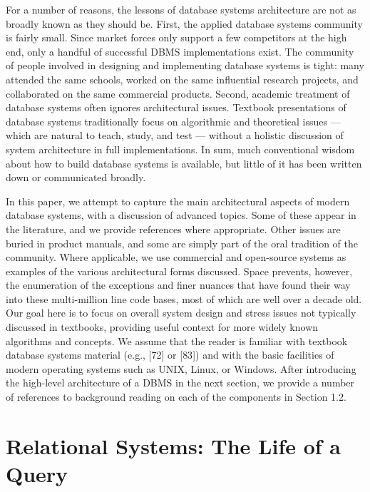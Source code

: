 \documentclass[a4paper,11pt,twoside,openright]{book}
\begin{document}
For a number of reasons, the lessons of database systems architecture
are not as broadly known as they should be. First, the applied database
systems community is fairly small. Since market forces only support a
few competitors at the high end, only a handful of successful DBMS
implementations exist. The community of people involved in designing and
implementing database systems is tight: many attended the same schools,
worked on the same influential research projects, and collaborated on
the same commercial products. Second, academic treatment of database
systems often ignores architectural issues. Textbook presentations of
database systems traditionally focus on algorithmic and theoretical
issues --- which are natural to teach, study, and test --- without a
holistic discussion of system architecture in full implementations. In
sum, much conventional wisdom about how to build database systems is
available, but little of it has been written down or communicated
broadly.

In this paper, we attempt to capture the main architectural aspects of
modern database systems, with a discussion of advanced topics. Some of
these appear in the literature, and we provide references where
appropriate. Other issues are buried in product manuals, and some are
simply part of the oral tradition of the community. Where applicable, we
use commercial and open-source systems as examples of the various
architectural forms discussed. Space prevents, however, the enumeration
of the exceptions and finer nuances that have found their way into these
multi-million line code bases, most of which are well over a decade old.
Our goal here is to focus on overall system design and stress issues not
typically discussed in textbooks, providing useful context for more
widely known algorithms and concepts. We assume that the reader is
familiar with textbook database systems material (e.g., {[}72{]} or
{[}83{]}) and with the basic facilities of modern operating systems such
as UNIX, Linux, or Windows. After introducing the high-level
architecture of a DBMS in the next section, we provide a number of
references to background reading on each of the components in Section
1.2.

\hypertarget{relational-systems-the-life-of-a-query}{%
\section{Relational Systems: The Life of a
Query}\label{relational-systems-the-life-of-a-query}}
\end{document}
